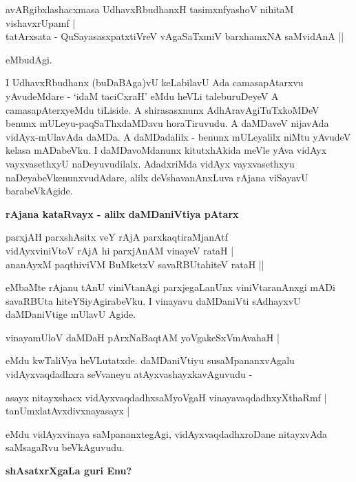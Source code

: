 \begin{shloka}
avARgibxlashacxmasa UdhavxRbudhanxH tasimxnfyashoV nihitaM vishavxrUpamf |\\\label{92b}
tatArxsata - QuSayasasxpatxtiVreV vAgaSaTxmiV barxhamxNA saMvidAnA ||
\end{shloka}

\noindent
eMbudAgi.

I UdhavxRbudhanx (buDaBAga)vU keLabilavU Ada camasapAtarxvu yAvudeMdare - `idaM taciCxraH' eMdu heVLi taleburuDeyeV A camasapAterxyeMdu tiLiside. A shirasasxnunx AdhAravAgiTuTxkoMDeV benunx mULeyu-paqSaThxdaMDavu horaTiruvudu. A daMDaveV nijavAda vidAyx-mUlavAda daMDa. A daMDadalilx - benunx mULeyalilx niMtu yAvudeV kelasa mADabeVku. I daMDavoMdanunx kitutxhAkida meVle yAva vidAyx vayxvasethxyU naDeyuvudilalx. AdadxriMda vidAyx vayxvasethxyu naDeyabeVkenunxvudAdare, alilx deVshavanAnxLuva rAjana viSayavU barabeVkAgide.

{\bigskip
\noindent
{\large\bf rAjana kataRvayx - alilx daMDaniVtiya pAtarx}}\label{page92b}
\medskip

\begin{shloka}
parxjAH parxshAsitx veY rAjA parxkaqtiraMjanAtf\\\label{92c}
vidAyxviniVtoV rAjA hi parxjAnAM vinayeV rataH |\\
ananAyxM paqthiviVM BuMketxV savaRBUtahiteV rataH ||
\end{shloka}

\noindent
eMbaMte rAjanu tAnU viniVtanAgi parxjegaLanUnx viniVtaranAnxgi mADi savaRBUta hiteYSiyAgirabeVku. I vinayavu daMDaniVti sAdhayxvU daMDaniVtige mUlavU Agide.

\begin{shloka}
vinayamUloV daMDaH pArxNaBaqtAM yoVgakeSxVmAvahaH |\label{93}
\end{shloka}

\noindent
eMdu kwTaliVya heVLutatxde. daMDaniVtiyu susaMpananxvAgalu vidAyxvaqdadhxra seVvaneyu atAyxvashayxkavAguvudu -

\begin{shloka}
asayx nitayxshacx vidAyxvaqdadhxsaMyoVgaH vinayavaqdadhxyXthaRmf |\\\label{93a}
tanUmxlatAvxdivxnayasayx |
\end{shloka}

\noindent
eMdu vidAyxvinaya saMpananxtegAgi, vidAyxvaqdadhxroDane nitayxvAda saMsagaRvu beVkAguvudu.

{\bigskip
\noindent
{\large\bf shAsatxrXgaLa guri Enu?}}\label{page93}
\medskip

